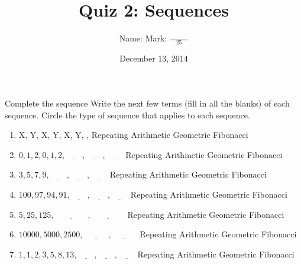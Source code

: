 \documentclass[12pt,letterpaper]{article}
\title{Quiz 2: Sequences}
\author{Name: \underline{\hspace{5cm}} Mark: $\displaystyle \frac{\hspace{3em}}{25}$}
\date{December 13, 2014}
\begin{document}
\maketitle

\thispagestyle{empty}

\begin{problem}{Complete the sequence}
 Write the next few terms (fill in all the blanks) of each sequence. Circle the
 type of sequence that applies to each sequence.

 \begin{enumerate}
  \item X, Y, X, Y, X, Y, \underline{\hspace{2em}}, \underline{\hspace{2em}}
  \hfill Repeating Arithmetic Geometric Fibonacci
  \item $0, 1, 2, 0, 1, 2, \underline{\hspace{2em}}, \underline{\hspace{2em}},
  \underline{\hspace{2em}}$
  \hfill Repeating Arithmetic Geometric Fibonacci
  \item $3, 5, 7, 9, \underline{\hspace{2em}}, \underline{\hspace{2em}},
  \underline{\hspace{2em}}$
  \hfill Repeating Arithmetic Geometric Fibonacci
  \item $100, 97, 94, 91, \underline{\hspace{2em}}, \underline{\hspace{2em}},
  \underline{\hspace{2em}}$
  \hfill Repeating Arithmetic Geometric Fibonacci
  \item $5, 25, 125, \underline{\hspace{4em}}, \underline{\hspace{4em}}$
  \hfill Repeating Arithmetic Geometric Fibonacci
  \item $10000, 5000, 2500, \underline{\hspace{3em}}, \underline{\hspace{3em}}$
  \hfill Repeating Arithmetic Geometric Fibonacci
  \item $1, 1, 2, 3, 5, 8, 13, \underline{\hspace{2em}},
  \underline{\hspace{2em}}, \underline{\hspace{2em}}$
  \hfill Repeating Arithmetic Geometric Fibonacci
 \end{enumerate}
\end{problem}
\end{document}
